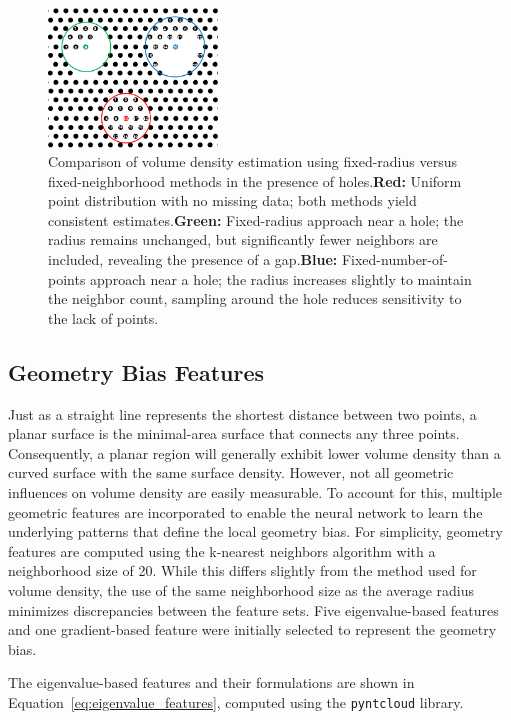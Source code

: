 \begin{figure}[H]
    \centering
    \includegraphics[width=0.4\textwidth]{figures/RadiusVSPoint_based.png}
    \caption{Comparison of volume density estimation using fixed-radius versus fixed-neighborhood methods in the presence of holes.\textbf{Red:} Uniform point distribution with no missing data; both methods yield consistent estimates.\textbf{Green:} Fixed-radius approach near a hole; the radius remains unchanged, but significantly fewer neighbors are included, revealing the presence of a gap.\textbf{Blue:} Fixed-number-of-points approach near a hole; the radius increases slightly to maintain the neighbor count, sampling around the hole reduces sensitivity to the lack of points.}\label{fig:radVSnbh_VD}
\end{figure}

\subsection*{Geometry Bias Features}
Just as a straight line represents the shortest distance between two points, a planar surface is the minimal-area surface that connects any three points. Consequently, a planar region will generally exhibit lower volume density than a curved surface with the same surface density. However, not all geometric influences on volume density are easily measurable. To account for this, multiple geometric features are incorporated to enable the neural network to learn the underlying patterns that define the local geometry bias.
For simplicity, geometry features are computed using the k-nearest neighbors algorithm with a neighborhood size of 20. While this differs slightly from the method used for volume density, the use of the same neighborhood size as the average radius minimizes discrepancies between the feature sets. Five eigenvalue-based features and one gradient-based feature were initially selected to represent the geometry bias. 

The eigenvalue-based features and their formulations are shown in Equation~\ref{eq:eigenvalue_features}, computed using the \texttt{pyntcloud} library. 

